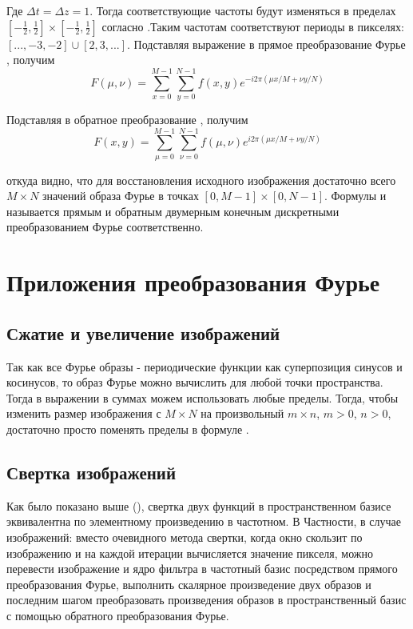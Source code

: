 \documentclass[oneside,final,14pt]{extreport}
\begin{document}
Где $\varDelta t = \varDelta z = 1$. Тогда соответствующие частоты будут изменяться в 
 пределах $[-\frac{1}{2},
\frac{1}{2}]
\times
[-\frac{1}{2},
\frac{1}{2}]$ согласно .Таким частотам соответствуют периоды в пикселях: $[...,-3,-2] \cup [2,3,...]$.
Подставляя выражение  в прямое преобразование Фурье , получим
\begin{equation}
F(\mu,\nu)
=
\sum_
{ x =  0}^{M-1}
\sum_
{ y =  0}^{N-1}
f(x,y)
e^{
-i2\pi(\mu x / M +
 \nu y / N )
}
\label{DFFT_2d}
\end{equation}

Подставляя  в обратное преобразование , получим
\begin{equation}
F(x,y)
=
\sum_
{ \mu =  0}^{M-1}
\sum_
{ \nu =  0}^{N-1}
f(\mu,\nu)
e^{
 i2\pi(\mu x / M +
 \nu y / N )
 \label{DIFFT_2d}
}
\end{equation}

откуда видно, что для восстановления исходного изображения достаточно всего $M\times N$ значений образа Фурье в точках $[0,M-1] \times [0,N-1]$.
 Формулы  и  называется прямым и обратным двумерным конечным дискретными преобразованием Фурье соответственно.

\chapter{ Приложения преобразования Фурье }
\section{Сжатие и увеличение изображений}
Так как все Фурье образы - периодические функции как суперпозиция синусов и косинусов, то образ Фурье можно вычислить для любой точки пространства. Тогда в выражении   
 в суммах можем использовать любые пределы.
Тогда, чтобы изменить размер изображения с $M\times N$ на произвольный $m\times n$, $m >0$, $n > 0$, достаточно просто поменять пределы в формуле .

\section{Свертка изображений}

Как было показано выше (), свертка двух функций в пространственном базисе эквивалентна по элементному произведению в частотном. В Частности, в случае изображений: вместо очевидного метода свертки, когда окно скользит по изображению и на каждой итерации вычисляется значение пикселя, можно перевести изображение и ядро фильтра в частотный базис посредством прямого преобразования Фурье, выполнить скалярное произведение двух образов и последним шагом преобразовать произведения образов в пространственный базис с помощью обратного преобразования Фурье. 
\end{document}
